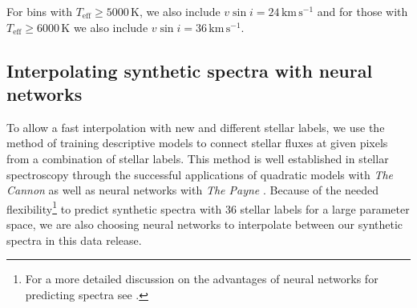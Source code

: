 \documentclass[
  journal=pasa,
  manuscript=research-paper, %
  year=2023,
  volume=37
]{cup-journal}
\newcommand{\Teff}{$T_\mathrm{eff}$\xspace}
\newcommand{\vsini}{$v \sin i$\xspace}
\newcommand{\kms}{\,\mathrm{km\,s^{-1}}}	%
\begin{document}
For bins with \Teff$\geq 5000\,\mathrm{K}$, we also include $v \sin i = 24 \kms$ and for those with \Teff$\geq 6000\,\mathrm{K}$ we also include $v \sin i = 36 \kms$. 

\subsection{Interpolating synthetic spectra with neural networks} \label{sec:interpolating_synthetic_spectra_with_neural_networks}

To allow a fast interpolation with new and different stellar labels, we use the method of training descriptive models to connect stellar fluxes at given pixels from a combination of stellar labels. This method is well established in stellar spectroscopy through the successful applications of quadratic models with \textit{The Cannon} \citep[see e.g.][]{Ness2015, Ness2016, Casey2016, Casey2017, Ho2017, Buder2018} as well as neural networks with \textit{The Payne} \citep[see e.g.][]{Ting2019, Xiang2019, Xiang2021}. Because of the needed flexibility\footnote{For a more detailed discussion on the advantages of neural networks for predicting spectra see \citet{Ting2019}.} to predict synthetic spectra with 36 stellar labels for a large parameter space, we are also choosing neural networks to interpolate between our synthetic spectra in this data release.
\end{document}
